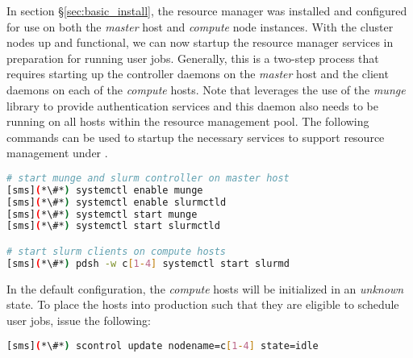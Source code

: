 In section \S\ref{sec:basic_install}, the \SLURM{} resource manager was installed
and configured for use on both the {\em master} host and {\em compute} node
instances. With the cluster nodes up and functional, we can now startup the
resource manager services in preparation for running user jobs. Generally, this
is a two-step process that requires starting up the controller daemons on the {\em
 master} host and the client daemons on each of the {\em compute} hosts.
Note that \SLURM{} leverages the use of the {\em munge} library to provide
authentication services and this daemon also needs to be running on all hosts
within the resource management pool. 
The following commands can be used to startup the necessary services to support
resource management under \SLURM{}.

\begin{lstlisting}[language=bash,keywords={}]
# start munge and slurm controller on master host
[sms](*\#*) systemctl enable munge
[sms](*\#*) systemctl enable slurmctld
[sms](*\#*) systemctl start munge
[sms](*\#*) systemctl start slurmctld

# start slurm clients on compute hosts
[sms](*\#*) pdsh -w c[1-4] systemctl start slurmd
\end{lstlisting}

In the default configuration, the {\em compute} hosts will be initialized in an
{\em unknown} state. To place the hosts into production such that they are
eligible to schedule user jobs, issue the following:

\begin{lstlisting}[language=bash]
[sms](*\#*) scontrol update nodename=c[1-4] state=idle
\end{lstlisting}



